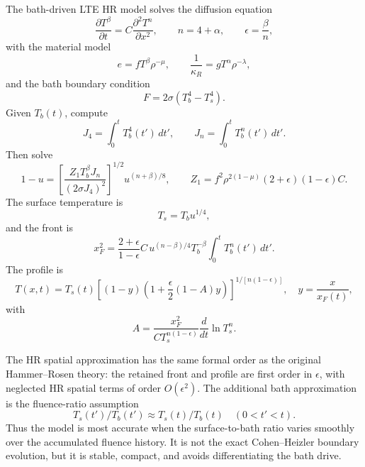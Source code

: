 \documentclass[11pt]{article}
\newcommand{\Tb}{T_b}
\newcommand{\Ts}{T_s}
\newcommand{\xf}{x_F}
\newcommand{\eps}{\epsilon}
\newcommand{\dif}{\,d}
\newcommand{\Jfour}{J_4}
\newcommand{\Jn}{J_n}
\begin{document}
The bath-driven LTE HR model solves the diffusion equation
\begin{equation}
 \frac{\partial T^\beta}{\partial t}=C\frac{\partial^2T^n}{\partial x^2},
 \qquad
 n=4+\alpha,
 \qquad
 \eps=\frac{\beta}{n},
\end{equation}
with the material model
\begin{equation}
 e=fT^\beta\rho^{-\mu},
 \qquad
 \frac{1}{\kappa_R}=gT^\alpha\rho^{-\lambda},
\end{equation}
and the bath boundary condition
\begin{equation}
 F=2\sigma(\Tb^4-\Ts^4).
\end{equation}
Given $\Tb(t)$, compute
\begin{equation}
 \Jfour=\int_0^t\Tb^4(t')\dif t',
 \qquad
 \Jn=\int_0^t\Tb^n(t')\dif t'.
\end{equation}
Then solve
\begin{equation}
 1-u=\left[\frac{Z_1\Tb^\beta\Jn}{(2\sigma\Jfour)^2}\right]^{1/2}
 u^{(n+\beta)/8},
 \qquad
 Z_1=f^2\rho^{2(1-\mu)}(2+\eps)(1-\eps)C.
\end{equation}
The surface temperature is
\begin{equation}
 \Ts=\Tb u^{1/4},
\end{equation}
and the front is
\begin{equation}
 \boxed{
 \xf^2=\frac{2+\eps}{1-\eps}C\,
 u^{(n-\beta)/4}\Tb^{-\beta}\int_0^t\Tb^n(t')\dif t'.}
\end{equation}
The profile is
\begin{equation}
 \boxed{
 T(x,t)=\Ts(t)
 \left[(1-y)\left(1+\frac{\eps}{2}(1-A)y\right)\right]^{1/[n(1-\eps)]},
 \quad y=\frac{x}{\xf(t)},}
\end{equation}
with
\begin{equation}
 A=\frac{\xf^2}{C\Ts^{n(1-\eps)}}\frac{d}{dt}\ln \Ts^n.
\end{equation}

The HR spatial approximation has the same formal order as the original
Hammer--Rosen theory: the retained front and profile are first order in
$\eps$, with neglected HR spatial terms of order $O(\eps^2)$.  The additional
bath approximation is the fluence-ratio assumption
\begin{equation}
 \Ts(t')/\Tb(t')\approx \Ts(t)/\Tb(t)
 \quad (0<t'<t).
\end{equation}
Thus the model is most accurate when the surface-to-bath ratio varies smoothly
over the accumulated fluence history.  It is not the exact Cohen--Heizler
boundary evolution, but it is stable, compact, and avoids differentiating the
bath drive.
\end{document}
